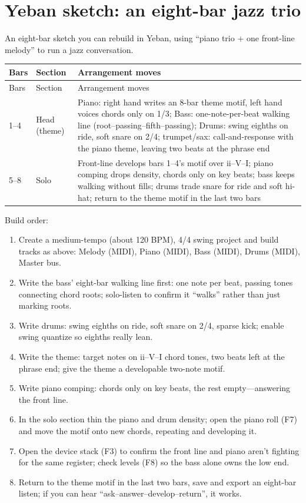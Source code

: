 \section{Yeban sketch: an eight-bar jazz trio}
\label{sec:jazz-yeban}

An eight-bar sketch you can rebuild in Yeban, using ``piano trio + one front-line melody'' to run a jazz conversation.

\begin{longtable}{p{}p{}p{}}
\toprule
Bars & Section & Arrangement moves \\
\midrule
\endfirsthead
\toprule
Bars & Section & Arrangement moves \\
\midrule
\endhead
1--4 & Head (theme) & Piano: right hand writes an 8-bar theme motif, left hand voices chords only on 1/3; Bass: one-note-per-beat walking line (root--passing--fifth--passing); Drums: swing eighths on ride, soft snare on 2/4; trumpet/sax: call-and-response with the piano theme, leaving two beats at the phrase end \\
5--8 & Solo & Front-line develops bars 1--4's motif over ii--V--I; piano comping drops density, chords only on key beats; bass keeps walking without fills; drums trade snare for ride and soft hi-hat; return to the theme motif in the last two bars \\
\bottomrule
\end{longtable}

Build order:

\begin{sloppypar}
\begin{enumerate}
\item Create a medium-tempo (about 120 BPM), 4/4 swing project and build tracks as above: Melody (MIDI), Piano (MIDI), Bass (MIDI), Drums (MIDI), Master bus.
\item Write the bass' eight-bar walking line first: one note per beat, passing tones connecting chord roots; solo-listen to confirm it ``walks'' rather than just marking roots.
\item Write drums: swing eighths on ride, soft snare on 2/4, sparse kick; enable swing quantize so eighths really lean.
\item Write the theme: target notes on ii--V--I chord tones, two beats left at the phrase end; give the theme a developable two-note motif.
\item Write piano comping: chords only on key beats, the rest empty---answering the front line.
\item In the solo section thin the piano and drum density; open the piano roll (F7) and move the motif onto new chords, repeating and developing it.
\item Open the device stack (F3) to confirm the front line and piano aren't fighting for the same register; check levels (F8) so the bass alone owns the low end.
\item Return to the theme motif in the last two bars, save and export an eight-bar listen; if you can hear ``ask--answer--develop--return'', it works.
\end{enumerate}
\end{sloppypar}

